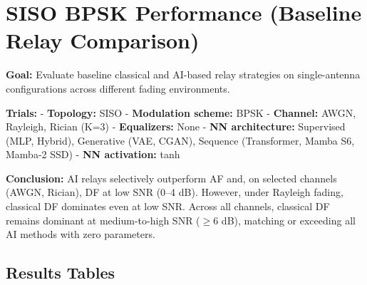 \section{SISO BPSK Performance (Baseline Relay Comparison)}\label{sec:siso-bpsk-performance-baseline-relay-comparison}

\textbf{Goal:} Evaluate baseline classical and AI-based relay strategies on single-antenna configurations across different fading environments.

\textbf{Trials:} - \textbf{Topology:} SISO - \textbf{Modulation scheme:} BPSK - \textbf{Channel:} AWGN, Rayleigh, Rician (K=3) - \textbf{Equalizers:} None - \textbf{NN architecture:} Supervised (MLP, Hybrid), Generative (VAE, CGAN), Sequence (Transformer, Mamba S6, Mamba-2 SSD) - \textbf{NN activation:} tanh

\textbf{Conclusion:} AI relays selectively outperform AF and, on selected channels (AWGN, Rician), DF at low SNR (0--4 dB). However, under Rayleigh fading, classical DF dominates even at low SNR. Across all channels, classical DF remains dominant at medium-to-high SNR (\(\geq 6\) dB), matching or exceeding all AI methods with zero parameters.

\subsection{Results Tables}\label{sec:results-tables}

